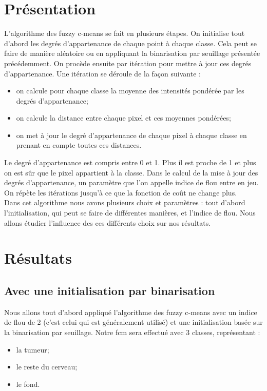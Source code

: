 \section{Présentation}
	L'algorithme des fuzzy c-means se fait en plusieurs étapes. On initialise tout d'abord les degrés d'appartenance de chaque point à chaque classe. Cela peut se faire de manière aléatoire ou en appliquant la binarisation par seuillage présentée précédemment. On procède ensuite par itération pour mettre à jour ces degrés d'appartenance. Une itération se déroule de la façon suivante :\\

	\begin{itemize}
		\item on calcule pour chaque classe la moyenne des intensités pondérée par les degrés d'appartenance;
		\item on calcule la distance entre chaque pixel et ces moyennes pondérées;
		\item on met à jour le degré d'appartenance de chaque pixel à chaque classe en prenant en compte toutes ces distances.
	\end{itemize}
	\bigskip

	Le degré d'appartenance est compris entre 0 et 1. Plus il est proche de 1 et plus on est sûr que le pixel appartient à la classe. Dans le calcul de la mise à jour des degrés d'appartenance, un paramètre que l'on appelle indice de flou entre en jeu. On répète les itérations jusqu'à ce que la fonction de coût ne change plus.\\

	Dans cet algorithme nous avons plusieurs choix et paramètres : tout d'abord l'initialisation, qui peut se faire de différentes manières, et l'indice de flou. Nous allons étudier l'influence des ces différents choix sur nos résultats.

\section{Résultats}

	\subsection{Avec une initialisation par binarisation} %
	\label{ssub:avec_une_initialisation_par_binarisation}
		Nous allons tout d'abord appliqué l'algorithme des fuzzy c-means avec un indice de flou de 2 (c'est celui qui est généralement utilisé) et une initialisation basée sur la binarisation par seuillage. Notre fcm sera effectué avec 3 classes, représentant :
		\begin{itemize}
			\item la tumeur;
			\item le reste du cerveau;
			\item le fond.
		\end{itemize}

